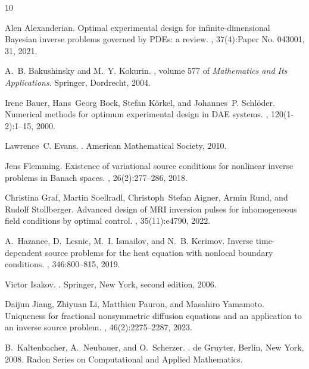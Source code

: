 \documentclass[12pt]{article}
\begin{document}
\begin{thebibliography}{10}

Alen Alexanderian.
\newblock Optimal experimental design for infinite-dimensional {B}ayesian
  inverse problems governed by {PDE}s: a review.
, 37(4):Paper No. 043001, 31, 2021.

A.~B. Bakushinsky and M.~Y. Kokurin.
,
  volume 577 of {\em Mathematics and Its Applications}.
\newblock Springer, Dordrecht, 2004.

Irene Bauer, Hans~Georg Bock, Stefan K\"orkel, and Johannes~P. Schl\"oder.
\newblock Numerical methods for optimum experimental design in {DAE} systems.
, 120(1-2):1--15, 2000.

Lawrence~C. Evans.
.
\newblock American Mathematical Society, 2010.

Jens Flemming.
\newblock Existence of variational source conditions for nonlinear inverse
  problems in {Banach} spaces.
, 26(2):277--286, 2018.

Christina Graf, Martin Soellradl, Christoph~Stefan Aigner, Armin Rund, and
  Rudolf Stollberger.
\newblock Advanced design of {MRI} inversion pulses for inhomogeneous field
  conditions by optimal control.
, 35(11):e4790, 2022.

A.~Hazanee, D.~Lesnic, M.~I. Ismailov, and N.~B. Kerimov.
\newblock Inverse time-dependent source problems for the heat equation with
  nonlocal boundary conditions.
, 346:800--815, 2019.

Victor Isakov.
.
\newblock Springer, New York, second edition, 2006.

Daijun Jiang, Zhiyuan Li, Matthieu Pauron, and Masahiro Yamamoto.
\newblock Uniqueness for fractional nonsymmetric diffusion equations and an
  application to an inverse source problem.
, 46(2):2275--2287,
  2023.

B.~Kaltenbacher, A.~Neubauer, and O.~Scherzer.
.
\newblock de Gruyter, Berlin, New York, 2008.
\newblock Radon Series on Computational and Applied Mathematics.


\end{thebibliography}
\end{document}
